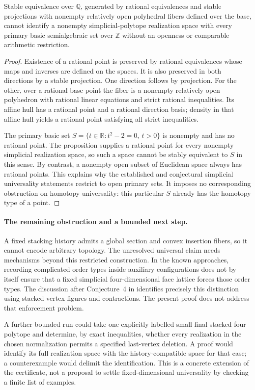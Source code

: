 \begin{corollary}
Stable equivalence over \(\mathbb Q\), generated by rational equivalences
and stable projections with nonempty relatively open polyhedral fibers
defined over the base, cannot identify a nonempty simplicial-polytope
realization space with every primary basic semialgebraic set over
\(\mathbb Z\) without an openness or comparable arithmetic restriction.
\end{corollary}
\begin{proof}
Existence of a rational point is preserved by rational equivalences
whose maps and inverses are defined on the spaces. It is also preserved
in both directions by a stable projection. One direction follows by
projection. For the other, over a rational base point the fiber is a
nonempty relatively open polyhedron with rational linear equations and
strict rational inequalities. Its affine hull has a rational point and
a rational direction basis; density in that affine hull yields a rational
point satisfying all strict inequalities.

The primary basic set
\(S=\{t\in\mathbb R:t^2-2=0,\ t>0\}\) is nonempty and has no rational
point. The proposition supplies a rational point for every nonempty
simplicial realization space, so such a space cannot be stably equivalent
to \(S\) in this sense. By contrast, a nonempty open subset of Euclidean
space always has rational points. This explains why the established and
conjectural simplicial universality statements restrict to open primary
sets. It imposes no corresponding obstruction on homotopy universality:
this particular \(S\) already has the homotopy type of a point.
\end{proof}

\paragraph{The remaining obstruction and a bounded next step.}
A fixed stacking history admits a global section and convex insertion
fibers, so it cannot encode arbitrary topology. The unresolved universal
claim needs mechanisms beyond this restricted construction. In the
known approaches, recording complicated order types inside auxiliary
configurations does not by itself ensure that a fixed simplicial
four-dimensional face lattice forces those order types. The discussion
after Conjecture~4 in \citet{adiprasitopadrol2017universality} identifies
precisely this distinction using stacked vertex figures and contractions.
The present proof does not address that enforcement problem.

A further bounded run could take one explicitly labelled small final
stacked four-polytope and determine, by exact inequalities, whether every
realization in the chosen normalization permits a specified last-vertex
deletion. A proof would identify its full realization space with the
history-compatible space for that case; a counterexample would delimit
the identification. This is a concrete extension of the certificate,
not a proposal to settle fixed-dimensional universality by checking a
finite list of examples.
